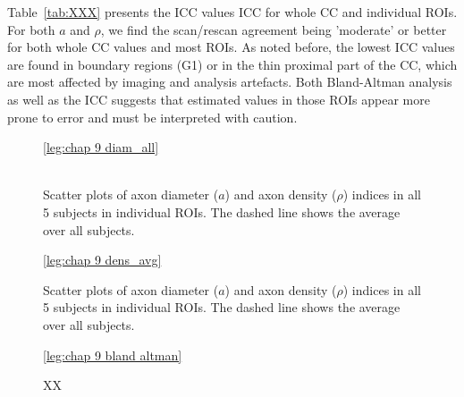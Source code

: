 Table~\ref{tab:XXX} presents the ICC values \gls{ICC} for whole CC and individual ROIs. For both $a$ and $\rho$, we find the scan/rescan agreement being 'moderate' or better for both whole CC values and most ROIs. As noted before, the lowest ICC values are found in boundary regions (G1) or in the thin proximal part of the CC, which are most affected by imaging and analysis artefacts. Both Bland-Altman analysis as well as the ICC suggests that estimated values in those ROIs appear more prone to error and must be interpreted with caution.

\begin{figure}[ht]
	\centering
	\ref{leg:chap 9 diam_all}
	\\	
	\\
	\caption{Scatter plots of axon diameter ($a$) and axon density ($\rho$) indices in all 5 subjects in individual ROIs. The dashed line shows the average over all subjects.}
	\label{fig:chap9 scan rescan scatterplots per subject}
\end{figure}

\begin{figure}[ht]
	\centering
	\ref{leg:chap 9 dens_avg}\\	
	\caption{Scatter plots of axon diameter ($a$) and axon density ($\rho$) indices in all 5 subjects in individual ROIs. The dashed line shows the average over all subjects.}
	\label{fig:chap9 scan rescan scatterplots per subject}
\end{figure}

\begin{figure}[ht]
	\centering
	\ref{leg:chap 9 bland altman}	
	\caption{XX}
	\label{fig:chap9 bland altman plot}	
\end{figure}	




